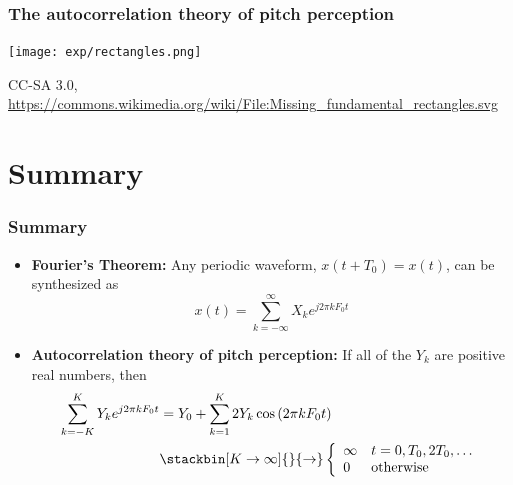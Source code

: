 \documentclass{beamer}
\begin{document}
\begin{frame}
  \frametitle{The autocorrelation theory of pitch perception}

  \centerline{\texttt{[image: exp/rectangles.png]}}
  {\small CC-SA 3.0, \url{https://commons.wikimedia.org/wiki/File:Missing_fundamental_rectangles.svg}}
\end{frame}

\section[Summary]{Summary}
\setcounter{subsection}{1}

\begin{frame}
  \frametitle{Summary}
  \begin{itemize}
  \item {\bf Fourier's Theorem:} Any periodic waveform,
    $x(t+T_0)=x(t)$, can be synthesized as
    \[
    x(t) = \sum_{k=-\infty}^\infty X_ke^{j2\pi kF_0t}
    \]
  \item {\bf Autocorrelation theory of pitch perception:} If all of
    the $Y_k$ are positive real numbers, then
    \begin{align*}
      \sum_{k=-K}^K Y_k e^{j2\pi kF_0t}
      &=  Y_0+ \sum_{k=1}^K 2Y_k\cos\left(2\pi kF_0t\right)\\
      &\stackbin[K\rightarrow\infty]{}{\rightarrow}
      \left\{\begin{array}{ll}
      \infty & t=0,T_0,2T_0,\ldots\\
      0 &\mbox{otherwise}
      \end{array}\right.
    \end{align*}
  \end{itemize}
  
\end{frame}
\end{document}
